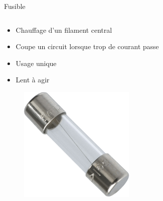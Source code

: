 \begin{frame}{Fusible}
    \begin{columns}
        \begin{column}{0.33\textwidth}
            \begin{itemize}
                \item Chauffage d'un filament central
                \item Coupe un circuit lorsque trop de courant passe
                \bigskip
                \item Usage unique
                \item Lent à agir
            \end{itemize}
            \vspace{12pt}
            \begin{figure}
                \centering
                \includegraphics[width=0.5\textwidth]{pictures/fuse.png}
            \end{figure}
        \end{column}


\end{columns}
\end{frame}
